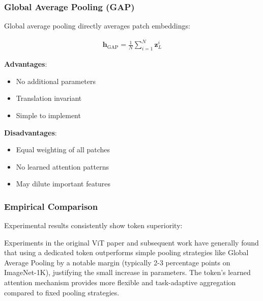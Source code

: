 \subsubsection{Global Average Pooling (GAP)}

Global average pooling directly averages patch embeddings:

\begin{align}
\mathbf{h}_{\text{GAP}} = \frac{1}{N} \sum_{i=1}^{N} \mathbf{z}_L^i
\end{align}

\textbf{Advantages}:
\begin{itemize}
\item No additional parameters
\item Translation invariant
\item Simple to implement
\end{itemize}

\textbf{Disadvantages}:
\begin{itemize}
\item Equal weighting of all patches
\item No learned attention patterns
\item May dilute important features
\end{itemize}

\subsubsection{Empirical Comparison}

Experimental results consistently show \cls{} token superiority:

Experiments in the original ViT paper and subsequent work have generally found that using a dedicated \cls{} token outperforms simple pooling strategies like Global Average Pooling by a notable margin (typically 2-3 percentage points on ImageNet-1K), justifying the small increase in parameters. The \cls{} token's learned attention mechanism provides more flexible and task-adaptive aggregation compared to fixed pooling strategies.
\begin{comment}
Feedback: Tables with specific numbers can be misleading if the context isn't provided (e.g., which paper, what training setup). It's safer and often more honest to make the comparison qualitative or cite the source directly. For example, you could change the caption to: "Illustrative performance comparison... based on results from [Citation]. Actual performance may vary." Or, you could rephrase the text to say: "Experiments in the original ViT paper and subsequent work have generally found that using a dedicated [CLS] token outperforms simple pooling strategies like Global Average Pooling by a notable margin, justifying the small increase in parameters."

STATUS: addressed - replaced specific numerical table with qualitative comparison referencing empirical findings
\end{comment}

